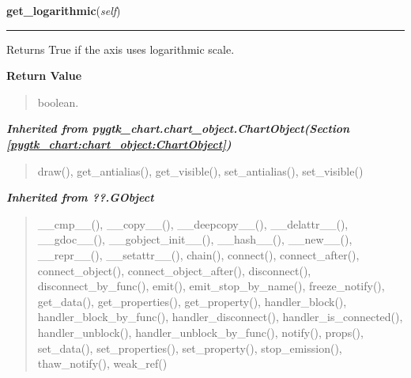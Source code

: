     \label{pygtk_chart:line_chart:Axis:get_logarithmic}

    \vspace{0.5ex}

\hspace{.8\funcindent}\begin{boxedminipage}{\funcwidth}

    \raggedright \textbf{get\_logarithmic}(\textit{self})

    \vspace{-1.5ex}

    \rule{\textwidth}{0.5\fboxrule}
\setlength{\parskip}{2ex}
    Returns True if the axis uses logarithmic scale.

\setlength{\parskip}{1ex}
      \textbf{Return Value}
    \vspace{-1ex}

      \begin{quote}
      boolean.

      \end{quote}

    \end{boxedminipage}


\large{\textbf{\textit{Inherited from pygtk\_chart.chart\_object.ChartObject\textit{(Section \ref{pygtk_chart:chart_object:ChartObject})}}}}

\begin{quote}
draw(), get\_antialias(), get\_visible(), set\_antialias(), set\_visible()
\end{quote}

\large{\textbf{\textit{Inherited from ??.GObject}}}

\begin{quote}
\_\_cmp\_\_(), \_\_copy\_\_(), \_\_deepcopy\_\_(), \_\_delattr\_\_(), \_\_gdoc\_\_(), \_\_gobject\_init\_\_(), \_\_hash\_\_(), \_\_new\_\_(), \_\_repr\_\_(), \_\_setattr\_\_(), chain(), connect(), connect\_after(), connect\_object(), connect\_object\_after(), disconnect(), disconnect\_by\_func(), emit(), emit\_stop\_by\_name(), freeze\_notify(), get\_data(), get\_properties(), get\_property(), handler\_block(), handler\_block\_by\_func(), handler\_disconnect(), handler\_is\_connected(), handler\_unblock(), handler\_unblock\_by\_func(), notify(), props(), set\_data(), set\_properties(), set\_property(), stop\_emission(), thaw\_notify(), weak\_ref()
\end{quote}

